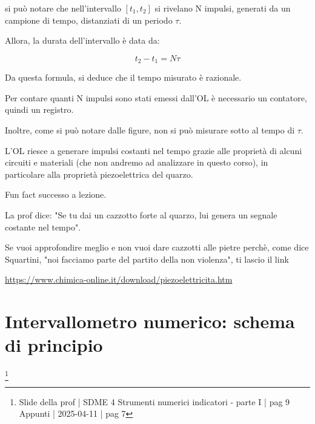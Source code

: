 si può notare che nell'intervallo $[t_1, t_2]$ si rivelano N impulsi, generati da un campione di tempo, 
distanziati di un periodo $\tau$. \newline 

Allora, la durata dell'intervallo è data da: 

{
    \Large 
    \begin{equation}
        t_2 - t_1 = N \tau
    \end{equation}
}

Da questa formula, si deduce che il tempo misurato è razionale. \newline 

Per contare quanti N impulsi sono stati emessi dall'OL è necessario un contatore, quindi un registro. \newline

Inoltre, come si può notare dalle figure, non si può misurare sotto al tempo di $\tau$. \newline 

L'OL riesce a generare impulsi costanti nel tempo grazie alle proprietà di alcuni circuiti e materiali (che non andremo ad analizzare in questo corso), 
in particolare alla proprietà piezoelettrica del quarzo. \newline 

\begin{tcolorbox}
    Fun fact successo a lezione. \newline 
    
    La prof dice: "Se tu dai un cazzotto forte al quarzo, lui genera un segnale costante nel tempo". \newline 

    Se vuoi approfondire meglio e non vuoi dare cazzotti alle pietre perchè, come dice Squartini, "noi facciamo parte del partito della non violenza", ti lascio il link \newline 

    \url{https://www.chimica-online.it/download/piezoelettricita.htm}
\end{tcolorbox}


\newpage 

\section{Intervallometro numerico: schema di principio}
\footnote{Slide della prof | SDME 4 Strumenti numerici indicatori - parte I | pag 9 \\  
Appunti | 2025-04-11 | pag 7}

